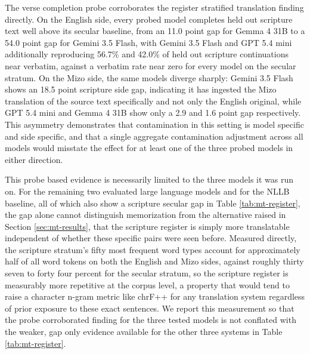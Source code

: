 \documentclass[11pt,a4paper]{article}
\begin{document}
The verse completion probe corroborates the register stratified translation finding directly. On the English side, every probed model completes held out scripture text well above its secular baseline, from an 11.0 point gap for Gemma 4 31B to a 54.0 point gap for Gemini 3.5 Flash, with Gemini 3.5 Flash and GPT 5.4 mini additionally reproducing 56.7\% and 42.0\% of held out scripture continuations near verbatim, against a verbatim rate near zero for every model on the secular stratum. On the Mizo side, the same models diverge sharply: Gemini 3.5 Flash shows an 18.5 point scripture side gap, indicating it has ingested the Mizo translation of the source text specifically and not only the English original, while GPT 5.4 mini and Gemma 4 31B show only a 2.9 and 1.6 point gap respectively. This asymmetry demonstrates that contamination in this setting is model specific and side specific, and that a single aggregate contamination adjustment across all models would misstate the effect for at least one of the three probed models in either direction.

This probe based evidence is necessarily limited to the three models it was run on. For the remaining two evaluated large language models and for the NLLB baseline, all of which also show a scripture secular gap in Table \ref{tab:mt-register}, the gap alone cannot distinguish memorization from the alternative raised in Section \ref{sec:mt-results}, that the scripture register is simply more translatable independent of whether these specific pairs were seen before. Measured directly, the scripture stratum's fifty most frequent word types account for approximately half of all word tokens on both the English and Mizo sides, against roughly thirty seven to forty four percent for the secular stratum, so the scripture register is measurably more repetitive at the corpus level, a property that would tend to raise a character n-gram metric like chrF++ for any translation system regardless of prior exposure to these exact sentences. We report this measurement so that the probe corroborated finding for the three tested models is not conflated with the weaker, gap only evidence available for the other three systems in Table \ref{tab:mt-register}.
\end{document}
